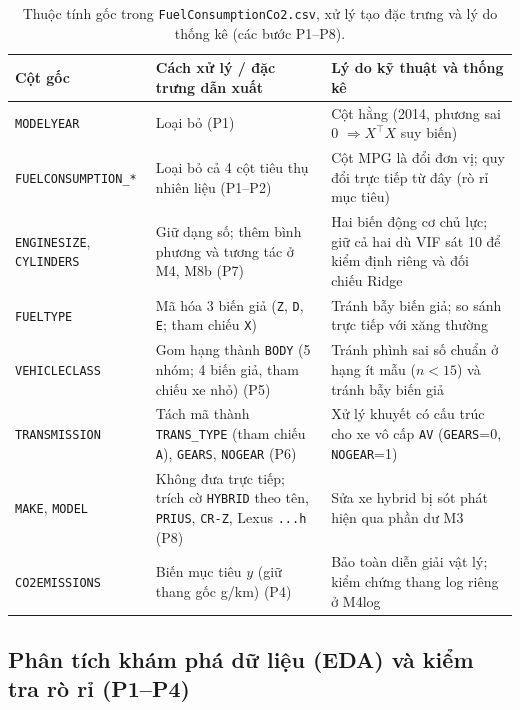 \begin{table}[htbp]
  \centering
  \caption{Thuộc tính gốc trong \texttt{FuelConsumptionCo2.csv}, xử lý tạo đặc trưng và lý do thống kê (các bước P1--P8).}
  \label{tab:vars-fe}
  \small
  \begin{tabular}{@{}l >{\raggedright\arraybackslash}p{5.2cm} >{\raggedright\arraybackslash}p{6.2cm}@{}}
    \toprule
    Cột gốc & Cách xử lý / đặc trưng dẫn xuất & Lý do kỹ thuật và thống kê \\
    \midrule
    \texttt{MODELYEAR} & Loại bỏ (P1) & Cột hằng (2014, phương sai 0 $\Rightarrow X^\top X$ suy biến) \\
    \texttt{FUELCONSUMPTION\_*} & Loại bỏ cả 4 cột tiêu thụ nhiên liệu (P1--P2) & Cột MPG là đổi đơn vị; \COtwo{} quy đổi trực tiếp từ đây (rò rỉ mục tiêu) \\
    \texttt{ENGINESIZE}, \texttt{CYLINDERS} & Giữ dạng số; thêm bình phương và tương tác ở M4, M8b (P7) & Hai biến động cơ chủ lực; giữ cả hai dù VIF sát 10 để kiểm định riêng và đối chiếu Ridge \\
    \texttt{FUELTYPE} & Mã hóa 3 biến giả (\texttt{Z}, \texttt{D}, \texttt{E}; tham chiếu \texttt{X}) & Tránh bẫy biến giả; so sánh trực tiếp với xăng thường \\
    \texttt{VEHICLECLASS} & Gom \nVehicleClasses{} hạng thành \texttt{BODY} (5 nhóm; 4 biến giả, tham chiếu xe nhỏ) (P5) & Tránh phình sai số chuẩn ở \nSparseClasses{} hạng ít mẫu ($n < 15$) và tránh bẫy biến giả \\
    \texttt{TRANSMISSION} & Tách \nTransCodes{} mã thành \texttt{TRANS\_TYPE} (tham chiếu \texttt{A}), \texttt{GEARS}, \texttt{NOGEAR} (P6) & Xử lý khuyết có cấu trúc cho \nNoGear{} xe vô cấp \texttt{AV} (\texttt{GEARS}=0, \texttt{NOGEAR}=1) \\
    \texttt{MAKE}, \texttt{MODEL} & Không đưa trực tiếp; trích cờ \texttt{HYBRID} theo tên, \texttt{PRIUS}, \texttt{CR-Z}, Lexus \texttt{...h} (P8) & Sửa \nHybridMissed{} xe hybrid bị sót phát hiện qua phần dư M3 \\
    \texttt{CO2EMISSIONS} & Biến mục tiêu $y$ (giữ thang gốc g/km) (P4) & Bảo toàn diễn giải vật lý; kiểm chứng thang log riêng ở M4log \\
    \bottomrule
  \end{tabular}
\end{table}

\subsection{Phân tích khám phá dữ liệu (EDA) và kiểm tra rò rỉ (P1--P4)}

